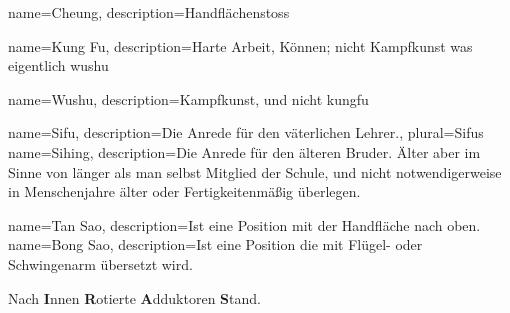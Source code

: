 






{
  name=Cheung,
  description={Handfl\"achenstoss}
}

{
  name=Kung Fu,
  description={Harte Arbeit, K\"onnen; nicht Kampfkunst was eigentlich wushu}
}

{
  name=Wushu,
  description={Kampfkunst, und nicht kungfu}
}




{
  name=Sifu,
  description={Die Anrede f\"ur den v\"aterlichen Lehrer.},
  plural=Sifus
}
{
  name=Sihing,
  description={Die Anrede f\"ur den \"alteren Bruder. \"Alter aber im Sinne von l\"anger als man selbst Mitglied der Schule, und nicht notwendigerweise in Menschenjahre \"alter oder Fertigkeitenm\"a{\ss}ig \"uberlegen.}
}


{
  name=Tan Sao,
  description={Ist eine Position mit der Handfl\"ache nach oben.}
}
{
  name=Bong Sao,
  description={Ist eine Position die mit Fl\"ugel- oder Schwingenarm \"ubersetzt wird.}
}

	{Nach \textbf{I}nnen \textbf{R}otierte \textbf{A}dduktoren \textbf{S}tand.}